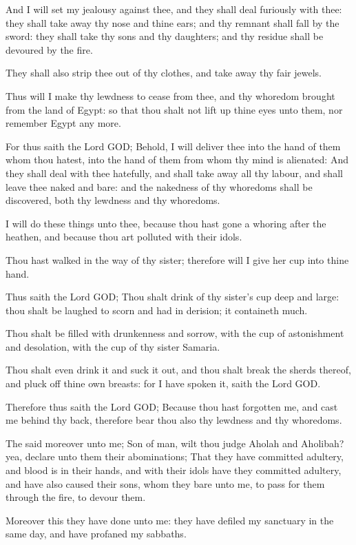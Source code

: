 \verse And I will set my jealousy against thee, and they shall deal furiously with thee: they shall take away thy nose and thine ears; and thy remnant shall fall by the sword: they shall take thy sons and thy daughters; and thy residue shall be devoured by the fire.

\verse They shall also strip thee out of thy clothes, and take away thy fair jewels.

\verse Thus will I make thy lewdness to cease from thee, and thy whoredom brought from the land of Egypt: so that thou shalt not lift up thine eyes unto them, nor remember Egypt any more.

\verse For thus saith the Lord GOD; Behold, I will deliver thee into the hand of them whom thou hatest, into the hand of them from whom thy mind is alienated: \verse And they shall deal with thee hatefully, and shall take away all thy labour, and shall leave thee naked and bare: and the nakedness of thy whoredoms shall be discovered, both thy lewdness and thy whoredoms.

\verse I will do these things unto thee, because thou hast gone a whoring after the heathen, and because thou art polluted with their idols.

\verse Thou hast walked in the way of thy sister; therefore will I give her cup into thine hand.

\verse Thus saith the Lord GOD; Thou shalt drink of thy sister's cup deep and large: thou shalt be laughed to scorn and had in derision; it containeth much.

\verse Thou shalt be filled with drunkenness and sorrow, with the cup of astonishment and desolation, with the cup of thy sister Samaria.

\verse Thou shalt even drink it and suck it out, and thou shalt break the sherds thereof, and pluck off thine own breasts: for I have spoken it, saith the Lord GOD.

\verse Therefore thus saith the Lord GOD; Because thou hast forgotten me, and cast me behind thy back, therefore bear thou also thy lewdness and thy whoredoms.

\verse The \LORD said moreover unto me; Son of man, wilt thou judge Aholah and Aholibah? yea, declare unto them their abominations; \verse That they have committed adultery, and blood is in their hands, and with their idols have they committed adultery, and have also caused their sons, whom they bare unto me, to pass for them through the fire, to devour them.

\verse Moreover this they have done unto me: they have defiled my sanctuary in the same day, and have profaned my sabbaths.

